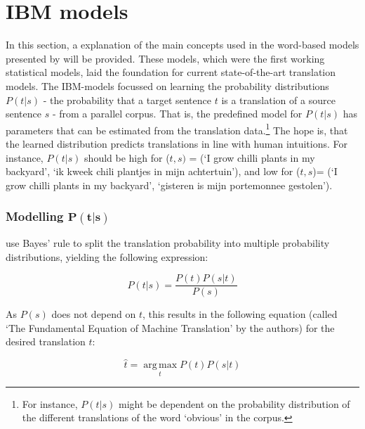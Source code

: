 \section{IBM models}
\label{sec:IBM}

In this section, a explanation of the main concepts used in the word-based models presented by \cite{brown1993mathematics} will be provided. These models, which were the first working statistical models, laid the foundation for current state-of-the-art translation models. The IBM-models focussed on learning the probability distributions $P(t|s)$ - the probability that a target sentence $t$ is a translation of a source sentence $s$ - from a parallel corpus. That is, the predefined model for $P(t|s)$ has parameters that can be estimated from the translation data.\footnote{For instance, $P(t|s)$ might be dependent on the probability distribution of the different translations of the word `obvious' in the corpus.} The hope is, that the learned distribution predicts translations in line with human intuitions. For instance, $P(t|s)$ should be high for ($t,s)$ = (`I grow chilli plants in my backyard', `ik kweek chili plantjes in mijn achtertuin'), and low for ($t,s$)= (`I grow chilli plants in my backyard', `gisteren is mijn portemonnee gestolen').

\subsubsection{Modelling $\mathbf{P(t|s)}$}
\citeauthor{brown1988statistical} use Bayes' rule to split the translation probability into multiple probability distributions, yielding the following expression:

\[
P(t|s) = \frac{P(t)P(s|t)}{P(s)}
\]

As $P(s)$ does not depend on $t$, this results in the following equation (called `The Fundamental Equation of Machine Translation' by the authors) for the desired translation $\hat{t}$:

\[
\hat{t} = \operatorname*{arg\,max}_t P(t)P(s|t)
\]

